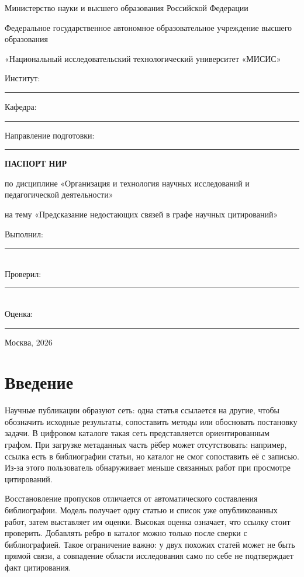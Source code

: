 \documentclass[a4paper,14pt,oneside]{extarticle}
\newcommand{\reportsection}[1]{%
  \clearpage
  \section*{#1}%
  \addcontentsline{toc}{section}{#1}%
}
\begin{document}
\fontsize{14bp}{17bp}\selectfont
\thispagestyle{empty}
{\centering
Министерство науки и высшего образования Российской Федерации\par
Федеральное государственное автономное образовательное учреждение высшего образования\par
«Национальный исследовательский технологический университет «МИСИС»\par
\vspace{1em}
Институт: \rule{8cm}{0.4pt}\par
Кафедра: \rule{8cm}{0.4pt}\par
Направление подготовки: \rule{6cm}{0.4pt}\par
\vfill
\textbf{ПАСПОРТ НИР}\par
по дисциплине «Организация и технология научных исследований и педагогической деятельности»\par
\vspace{\baselineskip}
на тему «Предсказание недостающих связей в графе научных цитирований»\par
}
\vfill
\begin{flushright}
Выполнил: \rule{7cm}{0.4pt}\\
Проверил: \rule{7cm}{0.4pt}\\
Оценка: \rule{7cm}{0.4pt}
\end{flushright}
\vfill
{\centering Москва, 2026\par}

\clearpage
\tableofcontents

\reportsection{Введение}

Научные публикации образуют сеть: одна статья ссылается на другие, чтобы обозначить исходные
результаты, сопоставить методы или обосновать постановку задачи. В цифровом каталоге такая сеть
представляется ориентированным графом. При загрузке метаданных часть рёбер может отсутствовать:
например, ссылка есть в библиографии статьи, но каталог не смог сопоставить её с записью.
Из-за этого пользователь обнаруживает меньше связанных работ при просмотре цитирований.

Восстановление пропусков отличается от автоматического составления библиографии. Модель получает
одну статью и список уже опубликованных работ, затем выставляет им оценки. Высокая оценка означает,
что ссылку стоит проверить. Добавлять ребро в каталог можно только после сверки с библиографией.
Такое ограничение важно: у двух похожих статей может не быть прямой связи, а совпадение области
исследования само по себе не подтверждает факт цитирования.
\end{document}
